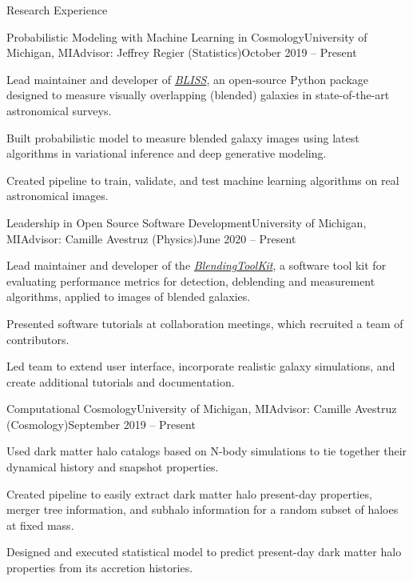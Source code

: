 \documentclass{resume} %
\begin{document}
\begin{rSection}{Research Experience}

\begin{rSubsection}{Probabilistic Modeling with Machine Learning in Cosmology}{University of Michigan, MI}{Advisor: Jeffrey Regier (Statistics)}{October 2019 -- Present}
\item Lead maintainer and developer of \textit{\href{https://github.com/prob-ml/bliss}{BLISS}}, an open-source Python package designed to measure visually overlapping (blended) galaxies in state-of-the-art astronomical surveys.
\item Built probabilistic model to measure blended galaxy images using latest algorithms in variational inference and deep generative modeling.
\item Created pipeline to train, validate, and test machine learning algorithms on real astronomical images.
\end{rSubsection}

\begin{rSubsection}{Leadership in Open Source Software Development}{University of Michigan, MI}{Advisor: Camille Avestruz (Physics)}{June 2020 -- Present}
\item Lead maintainer and developer of the \textit{\href{https://github.com/LSSTDESC/BlendingToolKit}{BlendingToolKit}}, a software tool kit for evaluating performance metrics for detection, deblending and measurement algorithms, applied to images of blended galaxies.

\item Presented software tutorials at collaboration meetings, which recruited a team of contributors.

\item Led team to extend user interface, incorporate realistic galaxy simulations, and create additional tutorials and documentation.
\end{rSubsection}

\begin{rSubsection}{Computational Cosmology}{University of Michigan, MI}{Advisor: Camille Avestruz (Cosmology)}{September 2019 -- Present}
\item Used dark matter halo catalogs based on N-body simulations to tie together their dynamical history and snapshot properties. 
\item Created pipeline to easily extract dark matter halo present-day properties, merger tree information, and subhalo information for a random subset of haloes at fixed mass.
\item Designed and executed statistical model to predict present-day dark matter halo properties from its accretion histories.
\end{rSubsection}


\end{rSection}
\end{document}
